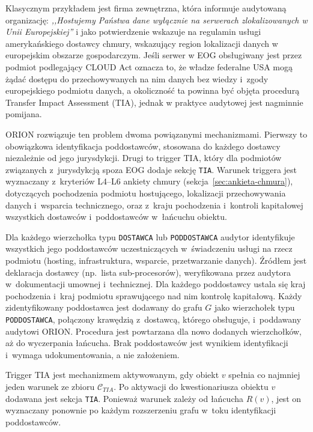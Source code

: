 Klasycznym przykładem jest firma zewnętrzna,
która informuje audytowaną organizację:
\textit{,,Hostujemy Państwa dane wyłącznie
na serwerach zlokalizowanych w Unii Europejskiej''}
i jako potwierdzenie wskazuje na regulamin usługi amerykańskiego dostawcy chmury, wskazujący region lokalizacji danych w europejskim obszarze gospodarczym. Jeśli serwer w EOG obsługiwany jest przez podmiot podlegający CLOUD Act oznacza to, że władze federalne USA mogą żądać dostępu
do przechowywanych na nim danych bez wiedzy i~zgody europejskiego podmiotu danych, a okoliczność ta powinna być objęta procedurą Transfer
Impact Assessment (TIA), jednak w praktyce audytowej jest nagminnie pomijana.

ORION rozwiązuje ten problem dwoma powiązanymi mechanizmami. Pierwszy to obowiązkowa identyfikacja poddostawców, stosowana do każdego dostawcy niezależnie od jego jurysdykcji. Drugi to trigger TIA, który dla podmiotów związanych z~jurysdykcją spoza EOG dodaje sekcję \texttt{TIA}. Warunek triggera jest wyznaczany z~kryteriów L4--L6 ankiety chmury (sekcja~\ref{sec:ankieta-chmura}), dotyczących pochodzenia podmiotu hostującego, lokalizacji przechowywania danych i~wsparcia technicznego, oraz z~kraju pochodzenia i~kontroli kapitałowej wszystkich dostawców i~poddostawców w~łańcuchu obiektu.

\begin{definition}
Dla każdego wierzchołka typu \texttt{DOSTAWCA} lub \texttt{PODDOSTAWCA}
audytor identyfikuje wszystkich jego poddostawców uczestniczących
w~świadczeniu usługi na rzecz podmiotu (hosting, infrastruktura,
wsparcie, przetwarzanie danych). Źródłem jest deklaracja dostawcy
(np.\ lista sub-procesorów), weryfikowana przez audytora
w~dokumentacji umownej i~technicznej. Dla każdego poddostawcy ustala się kraj pochodzenia i~kraj podmiotu sprawującego nad nim kontrolę kapitałową. Każdy zidentyfikowany poddostawca jest dodawany do grafu $G$
jako wierzchołek typu \texttt{PODDOSTAWCA}, połączony krawędzią z~dostawcą, którego obsługuje,
i~poddawany audytowi ORION. Procedura jest powtarzana dla nowo dodanych
wierzchołków, aż do wyczerpania łańcucha. Brak poddostawców jest
wynikiem identyfikacji i~wymaga udokumentowania, a nie założeniem.
\end{definition}

\begin{definition}
Trigger TIA jest mechanizmem aktywowanym, gdy obiekt $v$ spełnia co najmniej
jeden warunek ze zbioru $\mathcal{C}_{TIA}$. Po aktywacji do kwestionariusza
obiektu $v$ dodawana jest sekcja \texttt{TIA}. Ponieważ warunek zależy od łańcucha $R(v)$,
jest on wyznaczany ponownie po każdym rozszerzeniu grafu w~toku identyfikacji poddostawców.
\end{definition}


